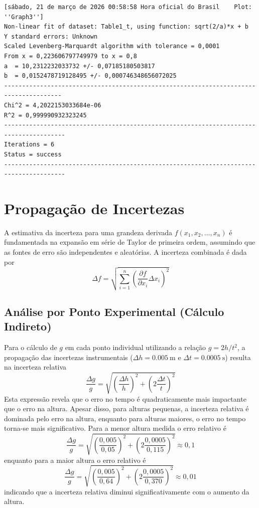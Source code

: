 \documentclass[12pt,a4paper]{article}
\begin{document}
\begin{verbatim}
[sábado, 21 de março de 2026 00:58:58 Hora oficial do Brasil	Plot: ''Graph3'']
Non-linear fit of dataset: Table1_t, using function: sqrt(2/a)*x + b
Y standard errors: Unknown
Scaled Levenberg-Marquardt algorithm with tolerance = 0,0001
From x = 0,223606797749979 to x = 0,8
a  = 10,2312232033732 +/- 0,07185180503817
b  = 0,0152478719128495 +/- 0,000746348656072025
--------------------------------------------------------------------------------------
Chi^2 = 4,2022153033684e-06
R^2 = 0,999990932323245
---------------------------------------------------------------------------------------
Iterations = 6
Status = success
---------------------------------------------------------------------------------------
\end{verbatim}

\section{Propagação de Incertezas}
A estimativa da incerteza para uma grandeza derivada $f(x_1, x_2, \dots, x_n)$ é fundamentada na expansão em série de Taylor de primeira ordem, assumindo que as fontes de erro são independentes e aleatórias. A incerteza combinada é dada por
\begin{equation}
    \Delta f = \sqrt{
        \sum_{i=1}^{n} 
        \left( \frac{\partial f}{\partial x_i} \Delta x_i \right)^2
        }
\end{equation}

\subsection{Análise por Ponto Experimental (Cálculo Indireto)}
Para o cálculo de $g$ em cada ponto individual utilizando a relação $g = 2h/t^2$, a propagação das incertezas instrumentais ($\Delta h = \SI{0,005}{\meter}$ e $\Delta t = \SI{0,0005}{\second}$) resulta na incerteza relativa
\begin{equation}
    \frac{\Delta g}{g} = 
    \sqrt{
        \left(\frac{\Delta h}{h}\right)^2 + 
        \left(2 \frac{\Delta t}{t}\right)^2
        }
        \label{eq:incerteza_relativa}
\end{equation}
Esta expressão revela que o erro no tempo é quadraticamente mais impactante que o erro na altura. Apesar disso, para alturas pequenas, a incerteza relativa é dominada pelo erro na altura, enquanto para alturas maiores, o erro no tempo torna-se mais significativo. Para a menor altura medida o erro relativo é
\begin{equation*}
    \frac{\Delta g}{g} = \sqrt{
        \left(\frac{0{,}005}{0{,}05}\right)^2 + 
        \left(2 \frac{0{,}0005}{0{,}115}\right)^2
        } \approx 0{,}1
\end{equation*}
enquanto para a maior altura o erro relativo é
\begin{equation*}
    \frac{\Delta g}{g} = \sqrt{
        \left(\frac{0{,}005}{0{,}64}\right)^2 + 
        \left(2 \frac{0{,}0005}{0{,}370}\right)^2
        } \approx 0{,}01
\end{equation*}
indicando que a incerteza relativa diminui significativamente com o aumento da altura.
\end{document}
